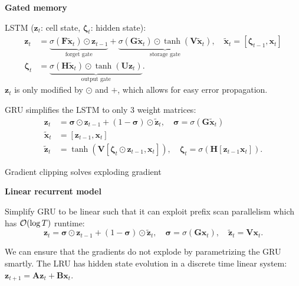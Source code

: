 \documentclass[10pt]{article}
\newenvironment{topic}[1]
{\textbf{\sffamily \footnotesize \colorbox{black}{\rlap{\textbf{\textcolor{white}{#1}}}\hspace{\linewidth}\hspace{-2\fboxsep}}}}
{}
\newenvironment{subtopic}[1]
{\begin{center}\textbf{\footnotesize \sffamily #1}\end{center}}
{}
\renewcommand{\mat}[1]{\ensuremath{\mathbf{#1}}}
\renewcommand{\vec}[1]{\ensuremath{\mathbold{#1}}}
\begin{document}
\begin{multicols*}{3}
\begin{topic}{Recurrent neural networks}
\begin{subtopic}{Gated memory}
            LSTM ($\vec{z}_t$: cell state, $\vec{\zeta}_t$: hidden state):
            \begin{align*}
                \vec{z}_t         & = \underbrace{\sigma(\mat{F}\tilde{\vec{x}}_t) \odot \vec{z}_{t-1}}_{\text{forget gate}} + \underbrace{\sigma(\mat{G}\tilde{\vec{x}}_t) \odot \tanh(\mat{V}\tilde{\vec{x}}_t)}_{\text{storage gate}}, \quad \tilde{\vec{x}}_t = [\vec{\zeta}_{t-1}, \vec{x}_t]                                                                                                \\
                \vec{\zeta}_t     & = \underbrace{\sigma(\mat{H}\tilde{\vec{x}}_t) \odot \tanh(\mat{U}\vec{z}_t)}_{\text{output gate}}.
            \end{align*}
            $\vec{z}_t$ is only modified by $\odot$ and $+$, which allows for easy error propagation.

            GRU simplifies the LSTM to only 3 weight matrices:
            \begin{align*}
                \vec{z}_t         & = \vec{\sigma} \odot \vec{z}_{t-1} + (1-\vec{\sigma}) \odot \tilde{\vec{z}}_t, \quad \vec{\sigma} = \sigma(\mat{G}\tilde{\vec{x}}_t) \\
                \tilde{\vec{x}}_t & = [\vec{z}_{t-1}, \vec{x}_t]                                                                                                         \\
                \tilde{\vec{z}}_t & = \tanh(\mat{V}[\vec{\zeta}_t \odot \vec{z}_{t-1}, \vec{x}_t]), \quad \vec{\zeta}_t = \sigma(\mat{H}[\vec{z}_{t-1} \vec{x}_t]).
            \end{align*}

            Gradient clipping solves exploding gradient
        \end{subtopic}

        \begin{subtopic}{Linear recurrent model}
            Simplify GRU to be linear such that it can exploit prefix scan parallelism which has $\bigo{\log T}$ runtime: \[
                \vec{z}_t = \vec{\sigma} \odot \vec{z}_{t-1} + (1-\vec{\sigma}) \odot \tilde{\vec{z}}_t, \quad \vec{\sigma} = \sigma(\mat{G}\vec{x}_t), \quad \tilde{\vec{z}}_t = \mat{V}\vec{x}_t.
            \]

            We can ensure that the gradients do not explode by parametrizing the GRU smartly. The LRU has
            hidden state evolution in a discrete time linear system: $\vec{z}_{t+1} = \mat{A} \vec{z}_t + \mat{B} \vec{x}_t$.


\end{subtopic}
\end{topic}
\end{multicols*}
\end{document}
